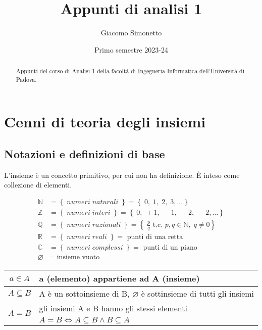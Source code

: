 \documentclass[a4paper]{article}
\title{Appunti di analisi 1}
\author{Giacomo Simonetto}
\date{Primo semestre 2023-24}
\begin{document}
\maketitle
\begin{abstract}
	Appunti del corso di Analisi 1 della facoltà di Ingegneria Informatica dell'Università di Padova.
\end{abstract}

\newpage

\tableofcontents

\newpage

\section{Cenni di teoria degli insiemi}
\subsection{Notazioni e definizioni di base}
L'insieme è un concetto primitivo, per cui non ha definizione. È inteso come collezione di elementi.

\begin{align*}
	\mathbb{N} &= \left\{ \; numeri \; naturali \; \right\} = \left\{ \; 0, \; 1, \; 2, \; 3, \dots \right\} \\
	\mathbb{Z} &= \left\{ \; numeri \; interi \; \right\} = \left\{ \; 0, \; +1, \; -1, \; +2, \; -2, \dots \right\} \\
	\mathbb{Q} &= \left\{ \; numeri \; razionali \; \right\} = \left\{ \; \frac{p}{q} \text{ t.c. } p,q \in \mathbb{N}, \; q \neq 0 \right\} \\
	\mathbb{R} &= \left\{ \; numeri \; reali \; \right\} = \text{ punti di una retta } \\
	\mathbb{C} &= \left\{ \; numeri \; complessi \; \right\} = \text{ punti di un piano } \\
	\varnothing &= \text{ insieme vuoto }
\end{align*}

\begin{center}
	\begin{tabular}{c l}
		\(a \in A\) & a (elemento) appartiene ad A (insieme) \\
		\midrule
		\(A \subseteq B\) & A è un sottoinsieme di B, \(\varnothing\) è sottinsieme di tutti gli insiemi \\
		\midrule
		\multirow{2}{*}{\(A = B\)} & gli insiemi A e B hanno gli stessi elementi \\
		& \(A = B \Leftrightarrow A \subseteq B \land B \subseteq A\)
	\end{tabular}
\end{center}
\end{document}
